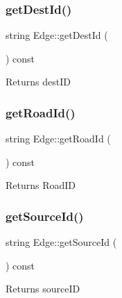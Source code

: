 \subsubsection{\texorpdfstring{get\+Dest\+Id()}{getDestId()}}
{\footnotesize\ttfamily string Edge\+::get\+Dest\+Id (\begin{DoxyParamCaption}{ }\end{DoxyParamCaption}) const\hspace{0.3cm}{\ttfamily [inline]}}

\begin{DoxyReturn}{Returns}
dest\+ID 
\end{DoxyReturn}
\mbox{\label{class_edge_a94d394f7343d93f5ac4742b28d0bdd03}} 
\subsubsection{\texorpdfstring{get\+Road\+Id()}{getRoadId()}}
{\footnotesize\ttfamily string Edge\+::get\+Road\+Id (\begin{DoxyParamCaption}{ }\end{DoxyParamCaption}) const\hspace{0.3cm}{\ttfamily [inline]}}

\begin{DoxyReturn}{Returns}
Road\+ID 
\end{DoxyReturn}
\mbox{\label{class_edge_a848848ceb4a39c87db8cb775a4bcd459}} 
\subsubsection{\texorpdfstring{get\+Source\+Id()}{getSourceId()}}
{\footnotesize\ttfamily string Edge\+::get\+Source\+Id (\begin{DoxyParamCaption}{ }\end{DoxyParamCaption}) const\hspace{0.3cm}{\ttfamily [inline]}}

\begin{DoxyReturn}{Returns}
source\+ID 
\end{DoxyReturn}
\mbox{\label{class_edge_a327337dc8341c070cf85e4ba618879b8}} 
